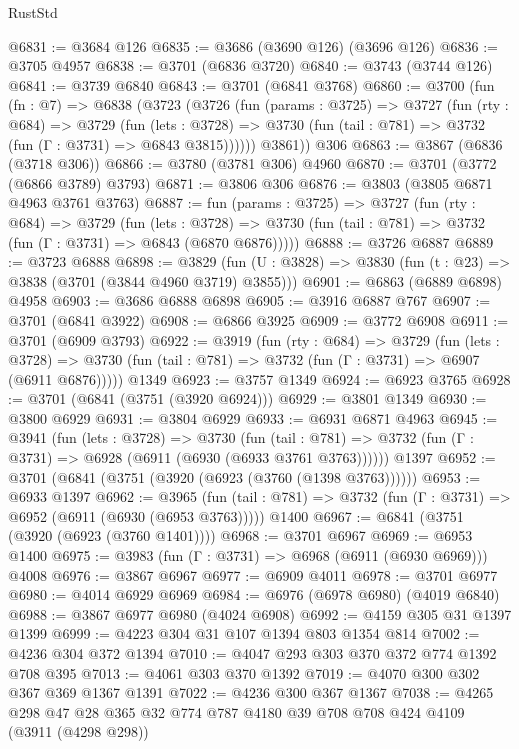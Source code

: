 \begin{lexlean}{RustStd}
\begin{coremodule}
@6831 := @3684 @126
@6835 := @3686 (@3690 @126) (@3696 @126)
@6836 := @3705 @4957
@6838 := @3701 (@6836 @3720)
@6840 := @3743 (@3744 @126)
@6841 := @3739 @6840
@6843 := @3701 (@6841 @3768)
@6860 := @3700
    (fun (fn : @7) =>
    @6838
      (@3723
        (@3726
          (fun (params : @3725) =>
          @3727
            (fun (rty : @684) =>
            @3729
              (fun (lets : @3728) =>
              @3730 (fun (tail : @781) => @3732 (fun (Γ : @3731) => @6843 @3815))))))
        @3861))
    @306
@6863 := @3867 (@6836 (@3718 @306))
@6866 := @3780 (@3781 @306) @4960
@6870 := @3701 (@3772 (@6866 @3789) @3793)
@6871 := @3806 @306
@6876 := @3803 (@3805 @6871 @4963 @3761 @3763)
@6887 := fun (params : @3725) =>
  @3727
    (fun (rty : @684) =>
    @3729
      (fun (lets : @3728) =>
      @3730 (fun (tail : @781) => @3732 (fun (Γ : @3731) => @6843 (@6870 @6876)))))
@6888 := @3726 @6887
@6889 := @3723 @6888
@6898 := @3829 (fun (U : @3828) => @3830 (fun (t : @23) => @3838 (@3701 (@3844 @4960 @3719) @3855)))
@6901 := @6863 (@6889 @6898) @4958
@6903 := @3686 @6888 @6898
@6905 := @3916 @6887 @767
@6907 := @3701 (@6841 @3922)
@6908 := @6866 @3925
@6909 := @3772 @6908
@6911 := @3701 (@6909 @3793)
@6922 := @3919
    (fun (rty : @684) =>
    @3729
      (fun (lets : @3728) =>
      @3730 (fun (tail : @781) => @3732 (fun (Γ : @3731) => @6907 (@6911 @6876)))))
    @1349
@6923 := @3757 @1349
@6924 := @6923 @3765
@6928 := @3701 (@6841 (@3751 (@3920 @6924)))
@6929 := @3801 @1349
@6930 := @3800 @6929
@6931 := @3804 @6929
@6933 := @6931 @6871 @4963
@6945 := @3941
    (fun (lets : @3728) =>
    @3730
      (fun (tail : @781) => @3732 (fun (Γ : @3731) => @6928 (@6911 (@6930 (@6933 @3761 @3763))))))
    @1397
@6952 := @3701 (@6841 (@3751 (@3920 (@6923 (@3760 (@1398 @3763))))))
@6953 := @6933 @1397
@6962 := @3965
    (fun (tail : @781) => @3732 (fun (Γ : @3731) => @6952 (@6911 (@6930 (@6953 @3763)))))
    @1400
@6967 := @6841 (@3751 (@3920 (@6923 (@3760 @1401))))
@6968 := @3701 @6967
@6969 := @6953 @1400
@6975 := @3983 (fun (Γ : @3731) => @6968 (@6911 (@6930 @6969))) @4008
@6976 := @3867 @6967
@6977 := @6909 @4011
@6978 := @3701 @6977
@6980 := @4014 @6929 @6969
@6984 := @6976 (@6978 @6980) (@4019 @6840)
@6988 := @3867 @6977 @6980 (@4024 @6908)
@6992 := @4159 @305 @31 @1397 @1399
@6999 := @4223 @304 @31 @107 @1394 @803 @1354 @814
@7002 := @4236 @304 @372 @1394
@7010 := @4047 @293 @303 @370 @372 @774 @1392 @708 @395
@7013 := @4061 @303 @370 @1392
@7019 := @4070 @300 @302 @367 @369 @1367 @1391
@7022 := @4236 @300 @367 @1367
@7038 := @4265 @298 @47 @28 @365 @32 @774 @787 @4180 @39 @708 @708 @424 @4109 (@3911 (@4298 @298))

\end{coremodule}
\end{lexlean}
